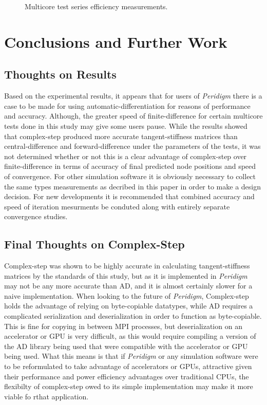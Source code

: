 \documentclass[preprint,12pt]{elsarticle}
\begin{document}
\begin{figure}[h]
  \centering
  \scalebox{.7}{}
  \caption{Multicore test series efficiency measurements.}
  \label{fig:multi_efficiency}
\end{figure}

\section{Conclusions and Further Work}

\subsection{Thoughts on Results} Based on the experimental results, it appears that for users of
\emph{Peridigm} there is a case to be made for using automatic-differentiation for reasons of
performance and accuracy. Although, the greater speed of finite-difference for certain multicore
tests done in this study may give some users pause. While the results showed that complex-step
produced more accurate tangent-stiffness matrices than central-difference and forward-difference 
under the parameters of the tests, it was not determined whether or not this is a clear advantage of complex-step over
finite-difference in terms of accuracy of final predicted node positions and speed of convergence. For other
simulation software it is obviously necessary to collect the same types measurements as decribed in
this paper in order to make a design decision. For new developments it is recommended that combined
accuracy and speed of iteration mesurments be conduted along with entirely separate convergence
studies. 

\subsection{Final Thoughts on Complex-Step} Complex-step was shown to be highly accurate in
calculating tangent-stiffness matrices by the standards of this study, but as it is implemented in
\emph{Peridigm} may not be any more accurate than AD, and it is almost certainly slower for a naive
implementation. When looking to the future of \emph{Peridigm}, Complex-step holds the advantage of
relying on byte-copiable datatypes, while AD requires a complicated serialization and
deserialization in order to function as byte-copiable. This is fine for copying in between MPI
processes, but deserialization on an accelerator or GPU is very difficult, as this would require
compiling a version of the AD library being used that were compatible with the accelerator or GPU
being used. What this means is that if \emph{Peridigm} or any simulation software were to be
reformulated to take advantage of accelerators or GPUs, attractive given their performance and power
efficiency advantages over traditional CPUs, the flexibilty of complex-step owed to its simple
implementation may make it more viable fo rthat application.
\end{document}

